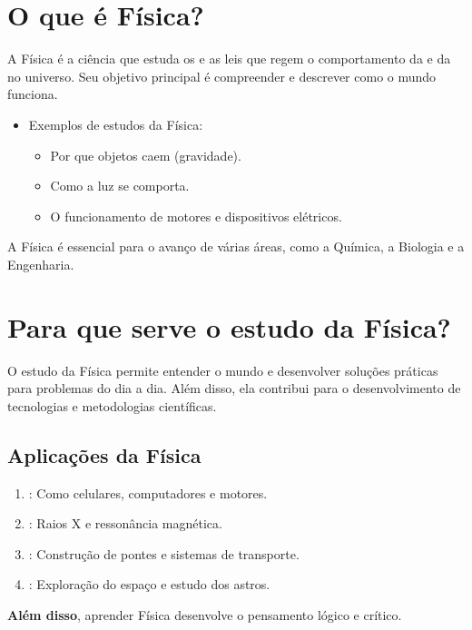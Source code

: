 \section{O que é Física?}
	A Física é a ciência que estuda os  e as leis que regem o comportamento da  e da  no universo. Seu objetivo principal é compreender e descrever como o mundo funciona.
	
	\begin{itemize}
		\item Exemplos de estudos da Física:
		\begin{itemize}
			\item Por que objetos caem (gravidade).
			\item Como a luz se comporta.
			\item O funcionamento de motores e dispositivos elétricos.
		\end{itemize}
	\end{itemize}
	
	A Física é essencial para o avanço de várias áreas, como a Química, a Biologia e a Engenharia.
	
	\section{Para que serve o estudo da Física?}
	O estudo da Física permite entender o mundo e desenvolver soluções práticas para problemas do dia a dia. Além disso, ela contribui para o desenvolvimento de tecnologias e metodologias científicas.
	
	\subsection*{Aplicações da Física}
	\begin{enumerate}
		\item {}: Como celulares, computadores e motores.
		\item {}: Raios X e ressonância magnética.
		\item {}: Construção de pontes e sistemas de transporte.
		\item {}: Exploração do espaço e estudo dos astros.
	\end{enumerate}
	
	\textbf{Além disso}, aprender Física desenvolve o pensamento lógico e crítico.
	
